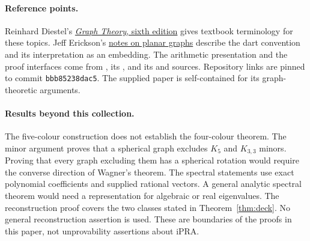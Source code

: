 \paragraph{Reference points.}
Reinhard Diestel's \href{https://diestel-graph-theory.com/}{\emph{Graph Theory},
sixth edition} gives textbook terminology for these topics. Jeff Erickson's
\href{https://jeffe.cs.illinois.edu/teaching/comptop/2023/notes/09-planar-graphs.html}{notes on planar graphs}
describe the dart convention and its interpretation as an embedding.
The arithmetic presentation and the proof interfaces come from
, its
,
and its 
and 
sources. Repository links are pinned to commit \texttt{bbb85238dac5}.
The supplied paper is self-contained for its graph-theoretic arguments.

\paragraph{Results beyond this collection.}
The five-colour construction does not establish the four-colour theorem.
The minor argument proves that a spherical graph excludes $K_5$ and $K_{3,3}$
minors. Proving that every graph excluding them has a spherical rotation
would require the converse direction of Wagner's theorem. The spectral
statements use exact polynomial coefficients and supplied rational vectors.
A general analytic spectral theorem would need a representation for
algebraic or real eigenvalues. The reconstruction proof covers the two
classes stated in Theorem~\ref{thm:deck}. No general reconstruction assertion
is used. These are boundaries of the proofs in this paper, not
unprovability assertions about iPRA.
